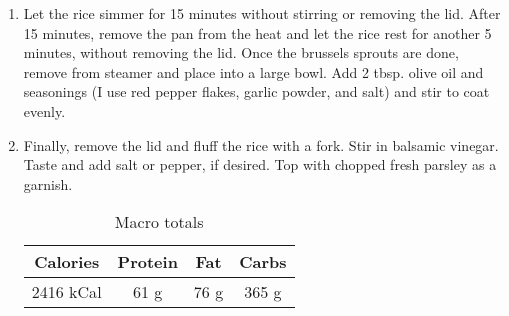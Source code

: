 \begin{multicols}{2}
\begin{enumerate}
\item Let the rice simmer for 15 minutes without stirring or removing the lid. After 15 minutes, remove the pan from the heat and let the rice rest for another 5 minutes, without removing the lid. Once the brussels sprouts are done, remove from steamer and place into a large bowl. Add 2 tbsp. olive oil and seasonings (I use red pepper flakes, garlic powder, and salt) and stir to coat evenly. 
\item Finally, remove the lid and fluff the rice with a fork. Stir in balsamic vinegar. Taste and add salt or pepper, if desired. Top with chopped fresh parsley as a garnish.


\begin{table}[H]
  \begin{center}
    \caption{Macro totals}
    \label{tab:table1}
    \begin{tabular}{c|c|c|c} %
      \textbf{Calories} & \textbf{Protein} & \textbf{Fat} & \textbf{Carbs}\\
      \hline
      2416 kCal & 61 g & 76 g & 365 g\\
    \end{tabular}
  \end{center}
\end{table}
 
\end{enumerate}
\end{multicols}
